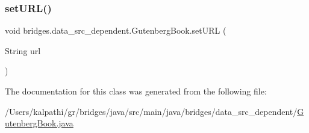 \mbox{\label{classbridges_1_1data__src__dependent_1_1_gutenberg_book_a9069f9c6835df30ccabf179158b9aa18}} 
\subsubsection{\texorpdfstring{setURL()}{setURL()}}
{\footnotesize\ttfamily void bridges.\+data\+\_\+src\+\_\+dependent.\+Gutenberg\+Book.\+set\+U\+RL (\begin{DoxyParamCaption}\item[{String}]{url }\end{DoxyParamCaption})}



The documentation for this class was generated from the following file\+:\begin{DoxyCompactItemize}
\item 
/\+Users/kalpathi/gr/bridges/java/src/main/java/bridges/data\+\_\+src\+\_\+dependent/\mbox{\hyperlink{_gutenberg_book_8java}{Gutenberg\+Book.\+java}}\end{DoxyCompactItemize}
